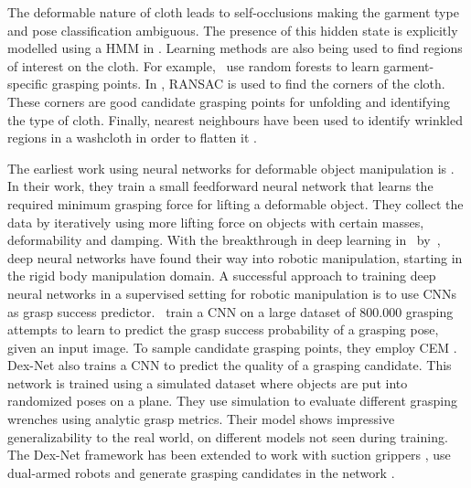 \documentclass[\home/main.tex]{subfiles}
\begin{document}
The deformable nature of cloth leads to self-occlusions making the garment type and pose classification ambiguous. The presence of this hidden state is explicitly modelled using a \gls{HMM} in \autocite{Cusumano2011}.  Learning methods are also being used to find regions of interest on the cloth. For example,~\textcite{Doumanoglou2016} use random forests to learn garment-specific grasping points. In \autocite{Maitin2010}, RANSAC \autocite{RANSAC} is used to find the corners of the cloth. These corners are good candidate grasping points for unfolding and identifying the type of cloth. Finally, nearest neighbours have been used to identify wrinkled regions in a washcloth in order to flatten it \autocite{Willimon2011}.

The earliest work using neural networks for deformable object manipulation is \autocite{Howard2000}. In their work, they train a small feedforward neural network that learns the required minimum grasping force for lifting a deformable object. They collect the data by iteratively using more lifting force on objects with certain masses, deformability and damping. 
With the breakthrough in deep learning in~\citeyear{Krizhevsky2012} by~\textcite{Krizhevsky2012}, deep neural networks have found their way into robotic manipulation, starting in the rigid body manipulation domain. A successful approach to training deep neural networks in a supervised setting for robotic manipulation is to use \glspl{CNN} as grasp success predictor.~\textcite{Levine2016} train a \gls{CNN} on a large dataset of $800.000$ grasping attempts to learn to predict the grasp success probability of a grasping pose, given an input image. To sample candidate grasping points, they employ CEM \autocite{CEM}. Dex-Net \autocite{dexnet2} also trains a \gls{CNN} to predict the quality of a grasping candidate. This network is trained using a simulated dataset where objects are put into randomized poses on a plane. They use simulation to evaluate different grasping wrenches using analytic grasp metrics. Their model shows impressive generalizability to the real world, on different models not seen during training. The Dex-Net framework has been extended to work with suction grippers \autocite{dexnet3}, use dual-armed robots \autocite{dexnet4} and generate grasping candidates in the network \autocite{Satish2019}.
\end{document}
